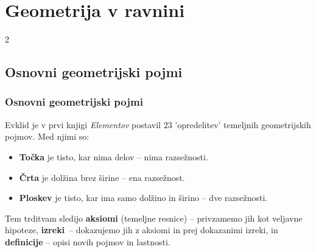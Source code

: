 \section{Geometrija v ravnini}

\begin{frame}
    \sectionpage
\end{frame}

\begin{frame}
    \begin{multicols}{2}
    \end{multicols}
\end{frame}

    \subsection{Osnovni geometrijski pojmi}

        \begin{frame}
            \frametitle{Osnovni geometrijski pojmi}

            \begin{block}{}
                Evklid je v prvi knjigi \textit{Elementov} postavil $23$ 'opredelitev' temeljnih geometrijskih pojmov.
                Med njimi so:
                \begin{itemize}
                    \item \textbf{Točka} je tisto, kar nima delov -- nima razsežnosti.
                    \item \textbf{Črta} je dolžina brez širine -- ena razsežnost.
                    \item \textbf{Ploskev} je tisto, kar ima samo dolžino in širino -- dve razsežnosti.
                \end{itemize}
            \end{block}

            \begin{block}{}
                Tem trditvam sledijo \textbf{aksiomi} (temeljne resnice) -- privzamemo jih kot veljavne hipoteze,
                 \textbf{izreki}~-- dokazujemo jih z aksiomi in prej dokazanimi izreki, 
                 in \textbf{definicije} -- opisi novih pojmov in lastnosti.
            \end{block}
        \end{frame}

